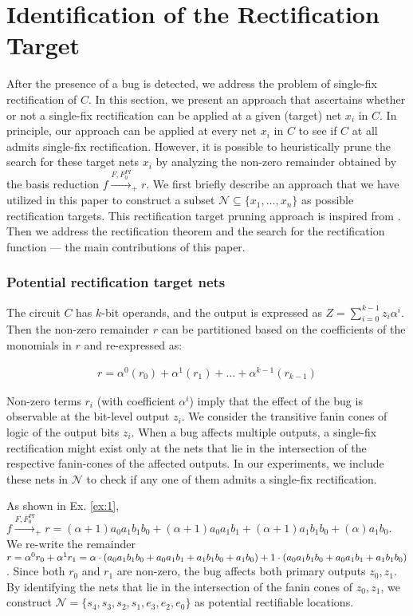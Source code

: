 \section{Identification of the Rectification Target}

After the presence of a bug is detected, we address the problem of
single-fix rectification of $C$. In this section, we present an
approach that ascertains whether or not a single-fix rectification can
be applied at a given (target) net $x_i$ in $C$. In principle, our
approach can be applied at every net $x_i$ in $C$ to see if $C$ at all
admits single-fix rectification. However, it is possible to 
heuristically prune the search for these target nets $x_i$ by
analyzing the non-zero remainder obtained by the \Grobner basis
reduction $f\xrightarrow{F,F_{0}^{PI}}_+r$. We first briefly describe
an approach that we have utilized in this paper to construct a subset
$\mathcal{N}\subseteq \{x_1,\dots,x_n\}$ as possible rectification
targets. This rectification target pruning approach is inspired from
\cite{farimah:2016}. 
Then we address the rectification theorem and the search for
the rectification function --- the main contributions of this paper. 

\subsubsection{Potential rectification target nets} The
circuit $C$ has $k$-bit operands, and the output is expressed as $Z =
\sum_{i=0}^{k-1} z_i \alpha^i$. Then the non-zero remainder $r$ can 
be partitioned based on the coefficients of the monomials in $r$ and
re-expressed as: %

\vspace{-0.1in}
\begin{align}
r = \alpha^0 (r_0) + \alpha^1 (r_1) + \dots + \alpha^{k-1} (r_{k-1})
\end{align}

Non-zero  terms $r_i$ (with coefficient $\alpha^i$) imply that the
effect of the bug is observable at the bit-level output $z_i$. We
consider the transitive fanin cones of logic of the output bits
$z_i$. When a bug affects multiple outputs, a single-fix rectification
might exist only at the nets that lie in the intersection of the
respective fanin-cones of the affected outputs. In our experiments, we
include these nets in $\mathcal{N}$ to check if any one of them admits
a single-fix rectification.

\begin{Example}
As shown in Ex. \ref{ex:1}, $f\xrightarrow{F,F_{0}^{PI}}_+r =
(\alpha+1)a_0a_1b_1b_0+(\alpha+1)a_0a_1b_1+(\alpha+1)a_1b_1b_0+(\alpha)a_1b_0$. We
re-write the remainder $r = \alpha^0 r_0 + \alpha^1 r_1 = 
\alpha\cdot (a_0a_1b_1b_0+a_0a_1b_1+a_1b_1b_0+a_1b_0) +
1\cdot (a_0a_1b_1b_0+a_0a_1b_1+a_1b_1b_0)$. Since both $r_0$ and $r_1$ are
non-zero, the bug affects both primary outputs $z_0, z_1$. By
identifying the nets that lie in the intersection of the fanin cones
of $z_0, z_1$, we construct $\mathcal{N} =
\{s_4,s_3,s_2,s_1,e_3,e_2,e_0\}$ as potential rectifiable locations.
\end{Example}

